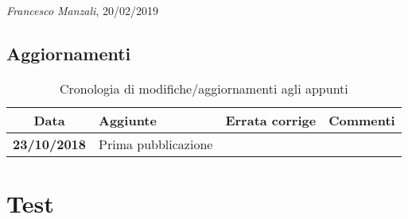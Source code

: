 \documentclass[12pt]{report} %
\theoremstyle{plain}
\theoremstyle{definition}
\begin{document}
\begin{flushright}
\textit{Francesco Manzali}, 20/02/2019
\end{flushright}
\clearpage
\section*{Aggiornamenti}
\begin{table}[hb]
    \centering
    \begin{tabular}{|cm{3cm}m{5cm}m{3cm}|}\toprule
        Data & Aggiunte & Errata corrige & Commenti\\\midrule
        \textbf{23/10/2018} & Prima pubblicazione & & \\
        \bottomrule
    \end{tabular}
    \caption{Cronologia di modifiche/aggiornamenti agli appunti}
    \label{updates}
\end{table}

\clearpage

\chapter{Test}


\clearpage
\begin{thebibliography}{9}

\end{thebibliography}

\printindex
\end{document}
